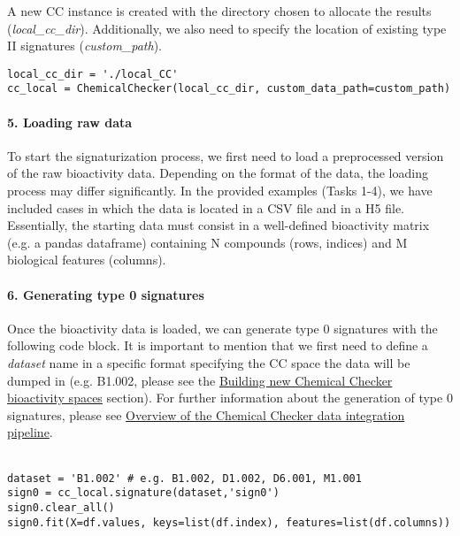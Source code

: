A new CC instance is created with the directory chosen to allocate the results (\textit{local\_cc\_dir}). Additionally, we also need to specify the location of existing type II signatures (\textit{custom\_path}). \\

\begin{lstlisting}
local_cc_dir = './local_CC'
cc_local = ChemicalChecker(local_cc_dir, custom_data_path=custom_path)
\end{lstlisting}

\paragraph{5. Loading raw data} \leavevmode

To start the signaturization process, we first need to load a preprocessed version of the raw bioactivity data. Depending on the format of the data, the loading process may differ significantly. In the provided examples (Tasks 1-4), we have included cases in which the data is located in a CSV file and in a H5 file. Essentially, the starting data must consist in a well-defined bioactivity matrix (e.g. a pandas dataframe) containing N compounds (rows, indices) and M biological features (columns). 

\paragraph{6. Generating type 0 signatures} \leavevmode

Once the bioactivity data is loaded, we can generate type 0 signatures with the following code block. It is important to mention that we first need to define a \textit{dataset} name in a specific format specifying the CC space the data will be dumped in (e.g. B1.002, please see the \hyperref[Building_NEW_CC_BIOACTIVITY_SPACES]{Building new Chemical Checker bioactivity spaces} section). For further information about the generation of type 0 signatures, please see \hyperref[Overview of the Chemical Checker data integration pipeline]{Overview of the Chemical Checker data integration pipeline}. \\ \\

\begin{lstlisting}
dataset = 'B1.002' # e.g. B1.002, D1.002, D6.001, M1.001
sign0 = cc_local.signature(dataset,'sign0')
sign0.clear_all()
sign0.fit(X=df.values, keys=list(df.index), features=list(df.columns))
\end{lstlisting}


